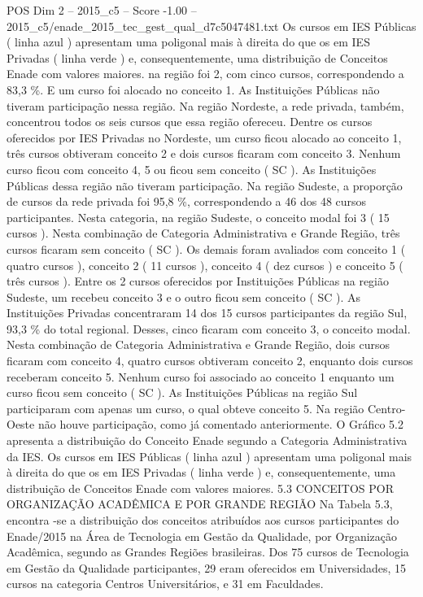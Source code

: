 \begin{textsample}{POS Dim 2 – 2015\_c5 – Score -1.00 – 2015\_c5/enade\_2015\_tec\_gest\_qual\_d7c5047481.txt}
Os cursos em IES Públicas ( linha azul ) apresentam uma poligonal mais à direita do que os em IES Privadas ( linha verde ) e, consequentemente, uma distribuição de Conceitos Enade com valores maiores. na região foi 2, com cinco cursos, correspondendo a 83,3 \%.
E um curso foi alocado no conceito 1.
As Instituições Públicas não tiveram participação nessa região.
Na região Nordeste, a rede privada, também, concentrou todos os seis cursos que essa região ofereceu.
Dentre os cursos oferecidos por IES Privadas no Nordeste, um curso ficou alocado ao conceito 1, três cursos obtiveram conceito 2 e dois cursos ficaram com conceito 3.
Nenhum curso ficou com conceito 4, 5 ou ficou sem conceito ( SC ).
As Instituições Públicas dessa região não tiveram participação.
Na região Sudeste, a proporção de cursos da rede privada foi 95,8 \%, correspondendo a 46 dos 48 cursos participantes.
Nesta categoria, na região Sudeste, o conceito modal foi 3 ( 15 cursos ).
Nesta combinação de Categoria Administrativa e Grande Região, três cursos ficaram sem conceito ( SC ).
Os demais foram avaliados com conceito 1 ( quatro cursos ), conceito 2 ( 11 cursos ), conceito 4 ( dez cursos ) e conceito 5 ( três cursos ).
Entre os 2 cursos oferecidos por Instituições Públicas na região Sudeste, um recebeu conceito 3 e o outro ficou sem conceito ( SC ).
As Instituições Privadas concentraram 14 dos 15 cursos participantes da região Sul, 93,3 \% do total regional.
Desses, cinco ficaram com conceito 3, o conceito modal.
Nesta combinação de Categoria Administrativa e Grande Região, dois cursos ficaram com conceito 4, quatro cursos obtiveram conceito 2, enquanto dois cursos receberam conceito 5.
Nenhum curso foi associado ao conceito 1 enquanto um curso ficou sem conceito ( SC ).
As Instituições Públicas na região Sul participaram com apenas um curso, o qual obteve conceito 5.
Na região Centro-Oeste não houve participação, como já comentado anteriormente.
O Gráfico 5.2 apresenta a distribuição do Conceito Enade segundo a Categoria Administrativa da IES.
Os cursos em IES Públicas ( linha azul ) apresentam uma poligonal mais à direita do que os em IES Privadas ( linha verde ) e, consequentemente, uma distribuição de Conceitos Enade com valores maiores. 5.3 CONCEITOS POR ORGANIZAÇÃO ACADÊMICA E POR GRANDE REGIÃO Na Tabela 5.3, encontra -se a distribuição dos conceitos atribuídos aos cursos participantes do Enade/2015 na Área de Tecnologia em Gestão da Qualidade, por Organização Acadêmica, segundo as Grandes Regiões brasileiras.
Dos 75 cursos de Tecnologia em Gestão da Qualidade participantes, 29 eram oferecidos em Universidades, 15 cursos na categoria Centros Universitários, e 31 em Faculdades.

\end{textsample}
